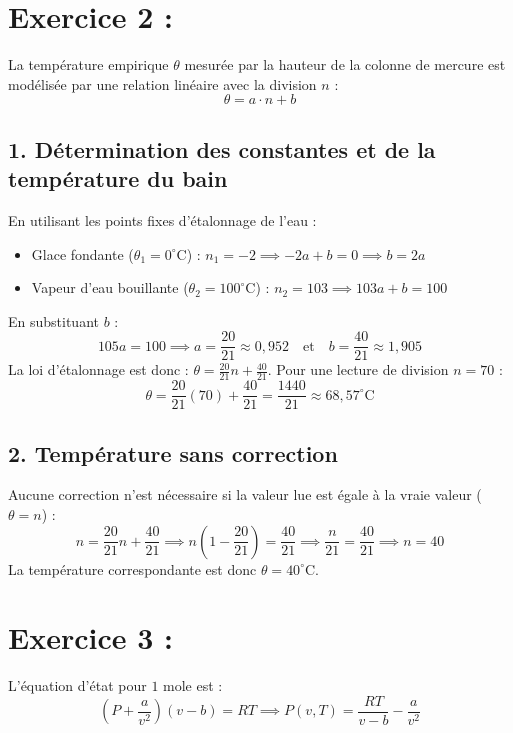 \documentclass[a4paper,12pt]{article}
\begin{document}
 	\newpage
 	
 	\section*{Exercice 2 :}
 	La température empirique $\theta$ mesurée par la hauteur de la colonne de mercure est modélisée par une relation linéaire avec la division $n$ :
 	\[ \theta = a \cdot n + b \]
 	
 	\subsection*{1. Détermination des constantes et de la température du bain}
 	En utilisant les points fixes d'étalonnage de l'eau :
 	\begin{itemize}
 		\item Glace fondante ($\theta_1 = 0^\circ\text{C}$) : $n_1 = -2 \implies -2a + b = 0 \implies b = 2a$
 		\item Vapeur d'eau bouillante ($\theta_2 = 100^\circ\text{C}$) : $n_2 = 103 \implies 103a + b = 100$
 	\end{itemize}
 	En substituant $b$ :
 	\[ 105a = 100 \implies a = \frac{20}{21} \approx 0,952 \quad \text{et} \quad b = \frac{40}{21} \approx 1,905 \]
 	La loi d'étalonnage est donc : $\theta = \frac{20}{21}n + \frac{40}{21}$.
 	Pour une lecture de division $n = 70$ :
 	\[ \theta = \frac{20}{21}(70) + \frac{40}{21} = \frac{1440}{21} \approx 68,57^\circ\text{C} \]
 	
 	\subsection*{2. Température sans correction}
 	Aucune correction n'est nécessaire si la valeur lue est égale à la vraie valeur ($\theta = n$) :
 	\[ n = \frac{20}{21}n + \frac{40}{21} \implies n \left(1 - \frac{20}{21}\right) = \frac{40}{21} \implies \frac{n}{21} = \frac{40}{21} \implies n = 40 \]
 	La température correspondante est donc $\theta = 40^\circ\text{C}$.
 	
 	\section*{Exercice 3 : }
 	L'équation d'état pour $1\text{ mole}$ est :
 	\[ \left(P + \frac{a}{v^2}\right)(v-b) = RT \implies P(v,T) = \frac{RT}{v-b} - \frac{a}{v^2} \]
 	
\end{document}
